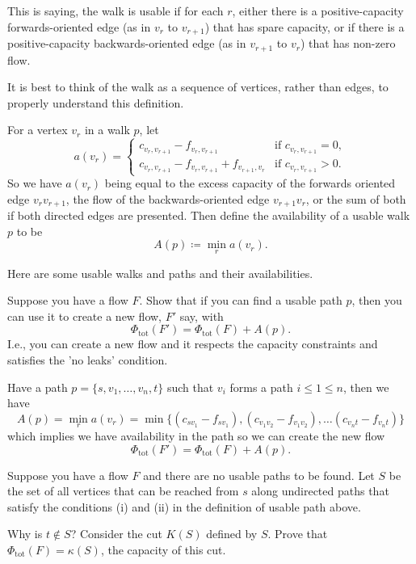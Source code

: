 \documentclass[10pt, a4paper]{article}
\begin{document}
This is saying,
the walk is usable if for each $r$,
either there is a positive-capacity forwards-oriented edge
(as in $v_r$ to $v_{r + 1}$)
that has spare capacity,
or if there is a positive-capacity backwards-oriented edge
(as in $v_{r + 1}$ to $v_r$)
that has non-zero flow.

It is best to think of the walk as a sequence of vertices,
rather than edges,
to properly understand this definition.

For a vertex $v_r$ in a walk $p$,
let
\[
a(v_r) = \begin{cases}
    c_{v_r, v_{r + 1}} - f_{v_r, v_{r + 1}} & \text{if }c_{v_r, v_{r + 1}} = 0, \\
    c_{v_r, v_{r + 1}} - f_{v_r, v_{r + 1}} + f_{v_{r + 1}, v_r} & \text{if }c_{v_r, v_{r + 1}} > 0.
\end{cases}
\]
So we have $a(v_r)$ being equal to the excess capacity of the forwards oriented edge $v_rv_{r + 1}$,
the flow of the backwards-oriented edge $v_{r + 1}v_r$,
or the sum of both if both directed edges are presented.
Then define the availability of a usable walk $p$ to be
\[
A(p) \coloneqq \min_ra(v_r).
\]
\begin{example}
    Here are some usable walks and paths and their availabilities.
\end{example}

\begin{example}
    Suppose you have a flow $F$.
    Show that if you can find a usable path $p$,
    then you can use it to create a new flow,
    $F'$ say,
    with
    \[
    \Phi_{\text{tot}}(F') = \Phi_{\text{tot}}(F) + A(p).
    \]
    I.e.,
    you can create a new flow and it respects the capacity constraints and satisfies the 'no leaks' condition.

    \begin{solution}
        Have a path $p = \{s, v_1, \dotsc, v_n, t\}$ such that $v_i$ forms a path $i \leq 1 \leq n$,
        then we have
        \[
        A(p) = \min_r{a(v_r)} = \min\{(c_{sv_1} - f_{sv_1}), (c_{v_1v_2} - f_{v_1v_2}), \dotsc (c_{v_nt} - f_{v_nt})\}
        \]
        which implies we have availability in the path so we can create the new flow
        \[
        \Phi_{\text{tot}}(F') = \Phi_{\text{tot}}(F) + A(p).
        \]
    \end{solution}
\end{example}

\begin{example}
    Suppose you have a flow $F$ and there are no usable paths to be found.
    Let $S$ be the set of all vertices that can be reached from $s$ along undirected paths that satisfy the conditions (i) and (ii) in the definition of usable path above.

    Why is $t \notin S$?
    Consider the cut $K(S)$ defined by $S$.
    Prove that $\Phi_{\text{tot}}(F) = \kappa(S)$,
    the capacity of this cut.    
\end{example}
\end{document}
